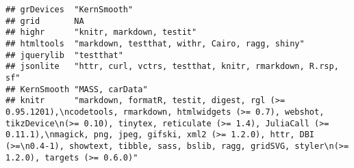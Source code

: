 \documentclass[
]{article}
\begin{document}
\begin{verbatim}
## grDevices  "KernSmooth"                                                                                                                                                                                                                                                                                                                                       
## grid       NA                                                                                                                                                                                                                                                                                                                                                 
## highr      "knitr, markdown, testit"                                                                                                                                                                                                                                                                                                                          
## htmltools  "markdown, testthat, withr, Cairo, ragg, shiny"                                                                                                                                                                                                                                                                                                    
## jquerylib  "testthat"                                                                                                                                                                                                                                                                                                                                         
## jsonlite   "httr, curl, vctrs, testthat, knitr, rmarkdown, R.rsp, sf"                                                                                                                                                                                                                                                                                         
## KernSmooth "MASS, carData"                                                                                                                                                                                                                                                                                                                                    
## knitr      "markdown, formatR, testit, digest, rgl (>= 0.95.1201),\ncodetools, rmarkdown, htmlwidgets (>= 0.7), webshot, tikzDevice\n(>= 0.10), tinytex, reticulate (>= 1.4), JuliaCall (>= 0.11.1),\nmagick, png, jpeg, gifski, xml2 (>= 1.2.0), httr, DBI (>=\n0.4-1), showtext, tibble, sass, bslib, ragg, gridSVG, styler\n(>= 1.2.0), targets (>= 0.6.0)"

\end{verbatim}
\end{document}
